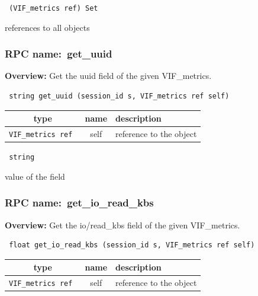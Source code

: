 \vspace{0.3cm}

{\tt 
(VIF\_metrics ref) Set
}


references to all objects
\vspace{0.3cm}
\vspace{0.3cm}
\vspace{0.3cm}
\subsubsection{RPC name:~get\_uuid}

{\bf Overview:} 
Get the uuid field of the given VIF\_metrics.

\begin{verbatim} string get_uuid (session_id s, VIF_metrics ref self)\end{verbatim}



 
\vspace{0.3cm}
\begin{tabular}{|c|c|p{7cm}|}
 \hline
{\bf type} & {\bf name} & {\bf description} \\ \hline
{\tt VIF\_metrics ref } & self & reference to the object \\ \hline 

\end{tabular}

\vspace{0.3cm}

{\tt 
string
}


value of the field
\vspace{0.3cm}
\vspace{0.3cm}
\vspace{0.3cm}
\subsubsection{RPC name:~get\_io\_read\_kbs}

{\bf Overview:} 
Get the io/read\_kbs field of the given VIF\_metrics.

\begin{verbatim} float get_io_read_kbs (session_id s, VIF_metrics ref self)\end{verbatim}



 
\vspace{0.3cm}
\begin{tabular}{|c|c|p{7cm}|}
 \hline
{\bf type} & {\bf name} & {\bf description} \\ \hline
{\tt VIF\_metrics ref } & self & reference to the object \\ \hline 

\end{tabular}

